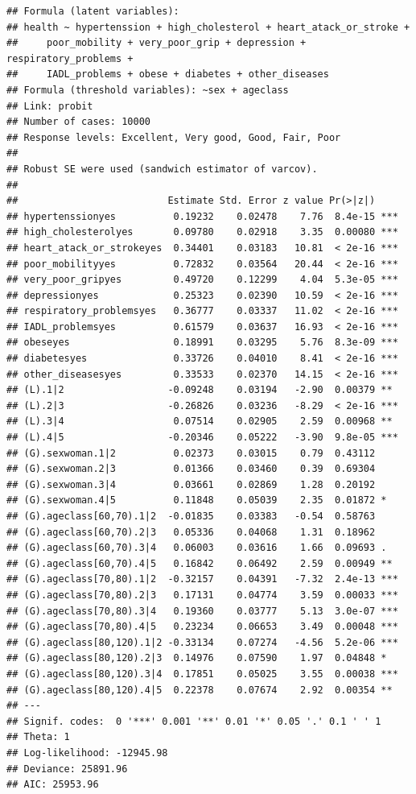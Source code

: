 \documentclass[]{article}
\begin{document}
\begin{verbatim}
## Formula (latent variables): 
## health ~ hypertenssion + high_cholesterol + heart_atack_or_stroke +  
##     poor_mobility + very_poor_grip + depression + respiratory_problems +  
##     IADL_problems + obese + diabetes + other_diseases
## Formula (threshold variables): ~sex + ageclass
## Link: probit
## Number of cases: 10000
## Response levels: Excellent, Very good, Good, Fair, Poor
## 
## Robust SE were used (sandwich estimator of varcov).
## 
##                          Estimate Std. Error z value Pr(>|z|)    
## hypertenssionyes          0.19232    0.02478    7.76  8.4e-15 ***
## high_cholesterolyes       0.09780    0.02918    3.35  0.00080 ***
## heart_atack_or_strokeyes  0.34401    0.03183   10.81  < 2e-16 ***
## poor_mobilityyes          0.72832    0.03564   20.44  < 2e-16 ***
## very_poor_gripyes         0.49720    0.12299    4.04  5.3e-05 ***
## depressionyes             0.25323    0.02390   10.59  < 2e-16 ***
## respiratory_problemsyes   0.36777    0.03337   11.02  < 2e-16 ***
## IADL_problemsyes          0.61579    0.03637   16.93  < 2e-16 ***
## obeseyes                  0.18991    0.03295    5.76  8.3e-09 ***
## diabetesyes               0.33726    0.04010    8.41  < 2e-16 ***
## other_diseasesyes         0.33533    0.02370   14.15  < 2e-16 ***
## (L).1|2                  -0.09248    0.03194   -2.90  0.00379 ** 
## (L).2|3                  -0.26826    0.03236   -8.29  < 2e-16 ***
## (L).3|4                   0.07514    0.02905    2.59  0.00968 ** 
## (L).4|5                  -0.20346    0.05222   -3.90  9.8e-05 ***
## (G).sexwoman.1|2          0.02373    0.03015    0.79  0.43112    
## (G).sexwoman.2|3          0.01366    0.03460    0.39  0.69304    
## (G).sexwoman.3|4          0.03661    0.02869    1.28  0.20192    
## (G).sexwoman.4|5          0.11848    0.05039    2.35  0.01872 *  
## (G).ageclass[60,70).1|2  -0.01835    0.03383   -0.54  0.58763    
## (G).ageclass[60,70).2|3   0.05336    0.04068    1.31  0.18962    
## (G).ageclass[60,70).3|4   0.06003    0.03616    1.66  0.09693 .  
## (G).ageclass[60,70).4|5   0.16842    0.06492    2.59  0.00949 ** 
## (G).ageclass[70,80).1|2  -0.32157    0.04391   -7.32  2.4e-13 ***
## (G).ageclass[70,80).2|3   0.17131    0.04774    3.59  0.00033 ***
## (G).ageclass[70,80).3|4   0.19360    0.03777    5.13  3.0e-07 ***
## (G).ageclass[70,80).4|5   0.23234    0.06653    3.49  0.00048 ***
## (G).ageclass[80,120).1|2 -0.33134    0.07274   -4.56  5.2e-06 ***
## (G).ageclass[80,120).2|3  0.14976    0.07590    1.97  0.04848 *  
## (G).ageclass[80,120).3|4  0.17851    0.05025    3.55  0.00038 ***
## (G).ageclass[80,120).4|5  0.22378    0.07674    2.92  0.00354 ** 
## ---
## Signif. codes:  0 '***' 0.001 '**' 0.01 '*' 0.05 '.' 0.1 ' ' 1
## Theta: 1
## Log-likelihood: -12945.98
## Deviance: 25891.96
## AIC: 25953.96
\end{verbatim}
\end{document}

